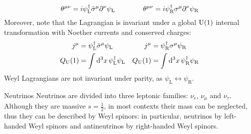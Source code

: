 \begin{equation}
  \theta^{\mu \nu} = i \psi_\text{L}^\dagger \bar{\sigma}^\mu \partial^\nu \psi_\text{L}
  \qquad \qquad
  \theta^{\mu \nu} = i \psi_\text{R}^\dagger \sigma^\mu \partial^\nu \psi_\text{R}
  \label{eq:1.82}
\end{equation}
Moreover, note that the Lagrangian is invariant under a global $ \mathrm{U}(1) $ internal transformation with Noether currents and conserved charges:
\begin{align*}
  j^\mu &= \psi_\text{L}^\dagger \bar{\sigma}^\mu \psi_\text{L} & j^\mu &= \psi_\text{R}^\dagger \sigma^\mu \psi_\text{R} \\
  Q_\mathrm{U}(1) &= \int \mathrm{d}^3x\, \psi_\text{L}^\dagger \psi_\text{L} & Q_\mathrm{U}(1) &= \int \mathrm{d}^3x\, \psi_\text{R}^\dagger \psi_\text{R}
\end{align*}
Weyl Lagrangians are not invariant under parity, as $ \psi_\text{L} \leftrightarrow \psi_\text{R} $.

\begin{example}{Neutrinos}{}
  Neutrinos are divided into three leptonic families: $ \nu_e $, $ \nu_\mu $ and $ \nu_\tau $. Although they are massive $ s = \frac{1}{2} $, in most contexts their mass can be neglected, thus they can be described by Weyl spinors: in particular, neutrinos by left-handed Weyl spinors and antineutrinos by right-handed Weyl spinors.
\end{example}










